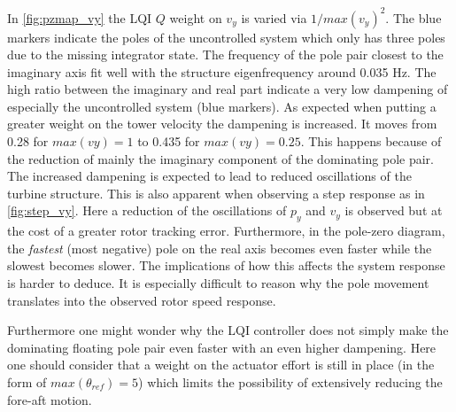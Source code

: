In \cref{fig:pzmap_vy} the LQI $ Q $ weight on $ v_y $ is varied via $ 1/max(v_y)^2 $. The blue markers indicate the poles of the uncontrolled system which only has three poles due to the missing integrator state. The frequency of the pole pair closest to the imaginary axis fit well with the structure eigenfrequency around 0.035 Hz. The high ratio between the imaginary and real part indicate a very low dampening of especially the uncontrolled system (blue markers). As expected when putting a greater weight on the tower velocity the dampening is increased. It moves from 0.28 for $ max(vy) = 1 $ to 0.435 for $ max(vy) = 0.25 $. This happens because of the reduction of mainly the imaginary component of the dominating pole pair. The increased dampening is expected to lead to reduced oscillations of the turbine structure. This is also apparent when observing a step response as in \cref{fig:step_vy}. Here a reduction of the oscillations of $ p_y $ and $ v_y $ is observed but at the cost of a greater rotor tracking error. Furthermore, in the pole-zero diagram, the \textit{fastest} (most negative) pole on the real axis becomes even faster while the slowest becomes slower. The implications of how this affects the system response is harder to deduce. It is especially difficult to reason why the pole movement translates into the observed rotor speed response.

Furthermore one might wonder why the LQI controller does not simply make the dominating floating pole pair even faster with an even higher dampening. Here one should consider that a weight on the actuator effort is still in place (in the form of $ max(\theta_{ref}) = 5 $) which limits the possibility of extensively reducing the fore-aft motion.


